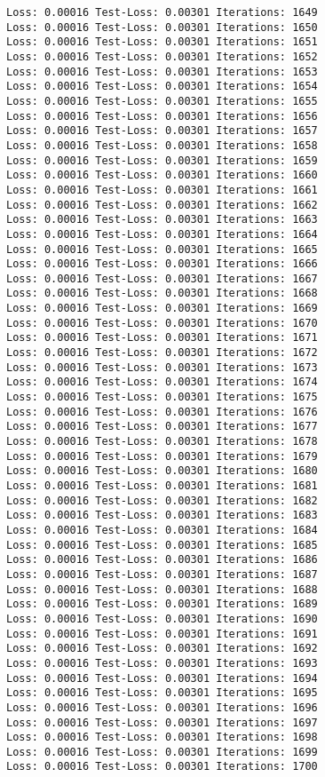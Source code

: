 \documentclass[11pt]{article}
\begin{document}
\begin{Verbatim}[commandchars=\\\{\}]
Loss: 0.00016 Test-Loss: 0.00301 Iterations: 1649
Loss: 0.00016 Test-Loss: 0.00301 Iterations: 1650
Loss: 0.00016 Test-Loss: 0.00301 Iterations: 1651
Loss: 0.00016 Test-Loss: 0.00301 Iterations: 1652
Loss: 0.00016 Test-Loss: 0.00301 Iterations: 1653
Loss: 0.00016 Test-Loss: 0.00301 Iterations: 1654
Loss: 0.00016 Test-Loss: 0.00301 Iterations: 1655
Loss: 0.00016 Test-Loss: 0.00301 Iterations: 1656
Loss: 0.00016 Test-Loss: 0.00301 Iterations: 1657
Loss: 0.00016 Test-Loss: 0.00301 Iterations: 1658
Loss: 0.00016 Test-Loss: 0.00301 Iterations: 1659
Loss: 0.00016 Test-Loss: 0.00301 Iterations: 1660
Loss: 0.00016 Test-Loss: 0.00301 Iterations: 1661
Loss: 0.00016 Test-Loss: 0.00301 Iterations: 1662
Loss: 0.00016 Test-Loss: 0.00301 Iterations: 1663
Loss: 0.00016 Test-Loss: 0.00301 Iterations: 1664
Loss: 0.00016 Test-Loss: 0.00301 Iterations: 1665
Loss: 0.00016 Test-Loss: 0.00301 Iterations: 1666
Loss: 0.00016 Test-Loss: 0.00301 Iterations: 1667
Loss: 0.00016 Test-Loss: 0.00301 Iterations: 1668
Loss: 0.00016 Test-Loss: 0.00301 Iterations: 1669
Loss: 0.00016 Test-Loss: 0.00301 Iterations: 1670
Loss: 0.00016 Test-Loss: 0.00301 Iterations: 1671
Loss: 0.00016 Test-Loss: 0.00301 Iterations: 1672
Loss: 0.00016 Test-Loss: 0.00301 Iterations: 1673
Loss: 0.00016 Test-Loss: 0.00301 Iterations: 1674
Loss: 0.00016 Test-Loss: 0.00301 Iterations: 1675
Loss: 0.00016 Test-Loss: 0.00301 Iterations: 1676
Loss: 0.00016 Test-Loss: 0.00301 Iterations: 1677
Loss: 0.00016 Test-Loss: 0.00301 Iterations: 1678
Loss: 0.00016 Test-Loss: 0.00301 Iterations: 1679
Loss: 0.00016 Test-Loss: 0.00301 Iterations: 1680
Loss: 0.00016 Test-Loss: 0.00301 Iterations: 1681
Loss: 0.00016 Test-Loss: 0.00301 Iterations: 1682
Loss: 0.00016 Test-Loss: 0.00301 Iterations: 1683
Loss: 0.00016 Test-Loss: 0.00301 Iterations: 1684
Loss: 0.00016 Test-Loss: 0.00301 Iterations: 1685
Loss: 0.00016 Test-Loss: 0.00301 Iterations: 1686
Loss: 0.00016 Test-Loss: 0.00301 Iterations: 1687
Loss: 0.00016 Test-Loss: 0.00301 Iterations: 1688
Loss: 0.00016 Test-Loss: 0.00301 Iterations: 1689
Loss: 0.00016 Test-Loss: 0.00301 Iterations: 1690
Loss: 0.00016 Test-Loss: 0.00301 Iterations: 1691
Loss: 0.00016 Test-Loss: 0.00301 Iterations: 1692
Loss: 0.00016 Test-Loss: 0.00301 Iterations: 1693
Loss: 0.00016 Test-Loss: 0.00301 Iterations: 1694
Loss: 0.00016 Test-Loss: 0.00301 Iterations: 1695
Loss: 0.00016 Test-Loss: 0.00301 Iterations: 1696
Loss: 0.00016 Test-Loss: 0.00301 Iterations: 1697
Loss: 0.00016 Test-Loss: 0.00301 Iterations: 1698
Loss: 0.00016 Test-Loss: 0.00301 Iterations: 1699
Loss: 0.00016 Test-Loss: 0.00301 Iterations: 1700

\end{Verbatim}
\end{document}
